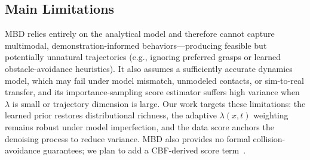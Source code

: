 \documentclass[conference]{IEEEtran}
\begin{document}
\subsection{Main Limitations}

MBD relies entirely on the analytical model and therefore cannot capture
multimodal, demonstration-informed behaviors---producing feasible but
potentially unnatural trajectories (e.g., ignoring preferred grasps or
learned obstacle-avoidance heuristics).
It also assumes a sufficiently accurate dynamics model, which may fail
under model mismatch, unmodeled contacts, or sim-to-real transfer, and
its importance-sampling score estimator suffers high variance when
$\lambda$ is small or trajectory dimension is large.
Our work targets these limitations: the learned prior restores
distributional richness, the adaptive $\lambda(x,t)$ weighting remains
robust under model imperfection, and the data score anchors the
denoising process to reduce variance.
MBD also provides no formal collision-avoidance guarantees; we plan to
add a CBF-derived score term~\cite{safeflow}.



\end{document}
